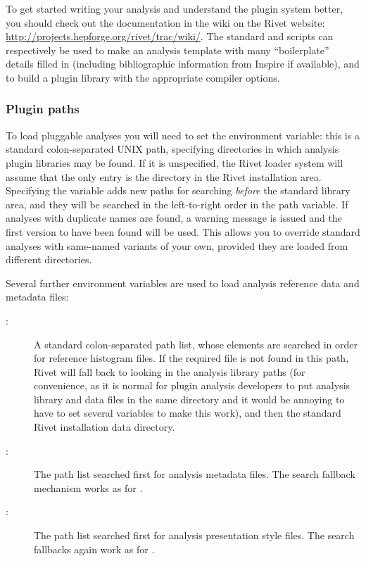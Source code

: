 \documentclass{JHEP3}
\begin{document}
To get started writing your analysis and understand the plugin system better,
you should check out the documentation in the wiki on the Rivet website:
\url{http://projects.hepforge.org/rivet/trac/wiki/}. The standard
 and  scripts can respectively be
used to make an analysis template with many ``boilerplate'' details filled in
(including bibliographic information from Inspire if available), and to build a
plugin library with the appropriate compiler options.


\subsubsection{Plugin paths}

To load pluggable analyses you will need to set the 
environment variable: this is a standard colon-separated UNIX path, specifying
directories in which analysis plugin libraries may be found. If it is
unspecified, the Rivet loader system will assume that the only entry is the
 directory in the Rivet installation area. Specifying the variable adds
new paths for searching \emph{before} the standard library area, and they will
be searched in the left-to-right order in the path variable. If analyses with
duplicate names are found, a warning message is issued and the first version to
have been found will be used. This allows you to override standard analyses
with same-named variants of your own, provided they are loaded from different
directories.

Several further environment variables are used to load analysis reference data
and metadata files:
\begin{description}
\item[:] A standard colon-separated path list, whose
  elements are searched in order for reference histogram files. If the required
  file is not found in this path, Rivet will fall back to looking in the
  analysis library paths (for convenience, as it is normal for plugin analysis
  developers to put analysis library and data files in the same directory and it
  would be annoying to have to set several variables to make this work), and
  then the standard Rivet installation data directory.
\item[:] The path list searched first for analysis
   metadata files. The search fallback mechanism works as for
  .
\item[:] The path list searched first for analysis
   presentation style files. The search fallbacks again work as for
  .
\end{description}
\end{document}
